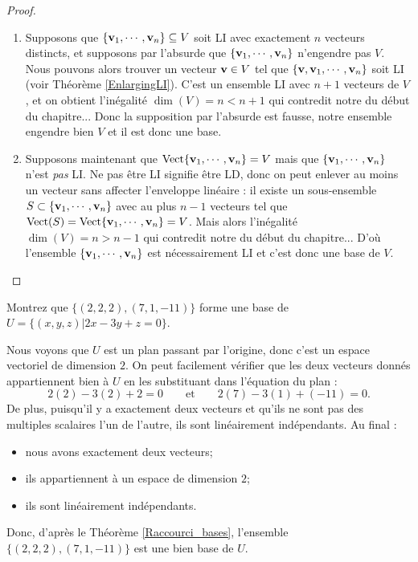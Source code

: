 \begin{proof}
\begin{enumerate}
\item Supposons que $\{\mathbf{v}_1, \cdots, \mathbf{v}_n\} \subseteq V$ soit LI avec exactement $n$ vecteurs distincts, et supposons 
par l'absurde que $\{\mathbf{v}_1, \cdots, \mathbf{v}_n\}$ n'engendre pas $V$.
Nous pouvons alors trouver un vecteur $\mathbf{v} \in V$ tel que $\{\mathbf{v}, \mathbf{v}_1, \cdots, \mathbf{v}_n\}$ soit LI (voir Th\'eor\`eme \ref{EnlargingLI}).
C'est un ensemble LI avec $n+1$ vecteurs de $V$, et on obtient l'inégalité $\dim(V)=n < n+1$ qui contredit notre  du début du chapitre...  Donc la supposition par l'absurde est fausse,
notre ensemble engendre bien $V$ et il est donc une base.

\item Supposons maintenant que $\textrm{Vect}\{\mathbf{v}_1, \cdots, \mathbf{v}_n\} = V$ mais que
 $\{\mathbf{v}_1, \cdots, \mathbf{v}_n\}$ n'est \emph{pas} LI.  Ne pas être LI signifie être LD, donc on peut enlever au moins un vecteur sans affecter l'enveloppe lin\'eaire :
il existe un sous-ensemble $S \subset \{\mathbf{v}_1, \cdots, \mathbf{v}_n\}$ avec au plus $n-1$ vecteurs tel que $\textrm{Vect}(S) = \textrm{Vect}\{\mathbf{v}_1, \cdots, \mathbf{v}_n\}=V$.  Mais alors l'inégalité $\dim(V)=n > n-1$ qui contredit notre  du début du chapitre...  D'o\`u l'ensemble $\{\mathbf{v}_1, \cdots, \mathbf{v}_n\}$ est nécessairement LI et  c'est donc une base de $V$.
\end{enumerate}
\end{proof}

\begin{myprob} Montrez que $\{(2,2,2), (7,1,-11)\}$ forme une base de $U = \{(x,y,z) | 2x-3y+z = 0\}$.  

\begin{mysol}  Nous voyons que $U$ est un plan passant par l'origine, donc c'est un espace vectoriel de dimension $2$.  On peut facilement vérifier que les deux vecteurs donnés appartiennent bien \`a $U$ en les substituant dans l'\'equation du plan :
$$
2(2) -3(2) + 2 = 0 \qquad \text{et} \qquad 2(7)-3(1)+(-11) = 0.
$$
De plus, puisqu'il y a exactement deux vecteurs et qu'ils ne sont pas des multiples scalaires 
l'un de l'autre, ils sont linéairement indépendants.  Au final :
\begin{itemize}
\item nous avons exactement deux vecteurs;
\item ils appartiennent \`a un espace de dimension $2$;
\item ils sont linéairement indépendants.
\end{itemize}
Donc, d'après le Théorème \ref{Raccourci_bases}, l'ensemble $\{(2,2,2), (7,1,-11)\}$ est une bien base de $U$.
\end{mysol}\end{myprob}

